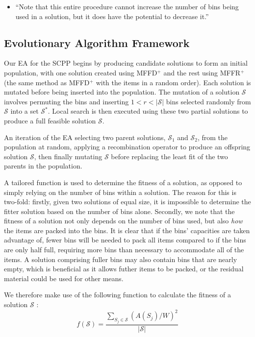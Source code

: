 \documentclass[authoryear]{elsarticle}
\begin{document}
{\color{myRed}
\begin{itemize}[leftmargin=*]
	\item ``Note that this entire procedure cannot increase the number of bins being used in a solution, but it does have the potential to decrease it.''
\end{itemize}
}

\subsection{Evolutionary Algorithm Framework}
\label{sub:eaframework}
\noindent Our EA for the SCPP begins by producing candidate solutions to form an initial population, with one solution created using MFFD$^+$ and the rest using MFFR$^+$ (the same method as MFFD$^+$ with the items in a random order). Each solution is mutated before being inserted into the population. The mutation of a solution $\mathcal{S}$ involves permuting the bins and inserting $1 < r < |\mathcal{S}|$ bins selected randomly from $\mathcal{S}$ into a set $\mathcal{S}^*$. Local search is then executed using these two partial solutions to produce a full feasible solution $\mathcal{S}$. 

An iteration of the EA  selecting two parent solutions, $\mathcal{S}_1$ and $\mathcal{S}_2$, from the population at random, applying a recombination operator to produce an offspring solution $\mathcal{S}$, then finally mutating $\mathcal{S}$ before replacing the least fit of the two parents in the population.

A tailored function is used to determine the fitness of a solution, as opposed to simply relying on the number of bins within a solution. The reason for this is two-fold: firstly, given two solutions of equal size, it is impossible to determine the fitter solution based on the number of bins alone. Secondly, we note that the fitness of a solution not only depends on the number of bins used, but also \emph{how} the items are packed into the bins. It is clear that if the bins' capacities are taken advantage of, fewer bins will be needed to pack all items compared to if the bins are only half full, requiring more bins than necessary to accommodate all of the items. A solution comprising fuller bins may also contain bins that are nearly empty, which is beneficial as it allows futher items to be packed, or the residual material could be used for other means. 

We therefore make use of the following function to calculate the fitness of a solution $\mathcal{S}$ \citep{falkenauer1992}:
\begin{equation}
	f(\mathcal{S}) = \frac{\sum_{S_j \in \mathcal{S}} (A(S_j)/W)^2}{|\mathcal{S}|}
\end{equation}
\end{document}
